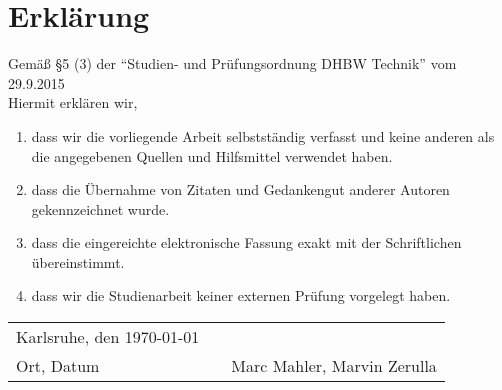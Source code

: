 \section*{Erklärung}
\vspace*{2em}
Gemäß \S 5 (3) der \enquote{Studien- und Prüfungsordnung DHBW Technik} vom 29.9.2015 \\
Hiermit erklären wir, \\
\begin{enumerate}
\item dass wir die vorliegende Arbeit selbstständig verfasst und keine anderen als die
angegebenen Quellen und Hilfsmittel verwendet haben. 
\item dass die Übernahme von Zitaten und Gedankengut anderer Autoren gekennzeichnet wurde.
\item dass die eingereichte elektronische Fassung exakt mit der Schriftlichen übereinstimmt.
\item dass wir die Studienarbeit keiner externen Prüfung vorgelegt haben.
\end{enumerate}
\vspace{3em}
\begin{tabular}{lp{2em}l}
 Karlsruhe, den \today  && \hspace{7cm} \\\cline{1-1}\cline{3-3}
 Ort, Datum     &&  Marc Mahler, Marvin Zerulla
\end{tabular} 
\newpage